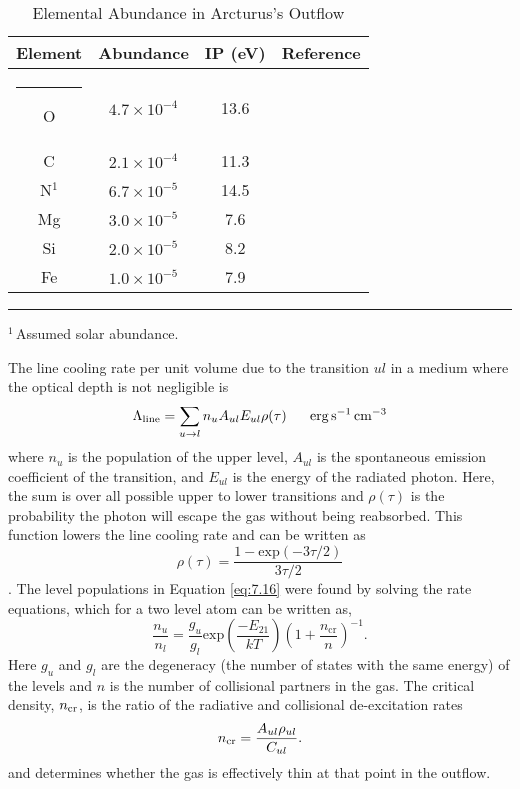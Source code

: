 \begin{table}[!ht]
\begin{center}
\caption[Elemental Abundance in Arcturus's Outflow]{Elemental Abundance in Arcturus's Outflow}
\begin{tabular}{cccc}
\hline
\hline
\rule{0pt}{2.5ex} Element & Abundance & IP (eV) & Reference \\
\hline
\rule{-2.5pt}{2.5ex}	O &  $4.7\times 10^{-4}$ & 13.6 & \cite{ramirez_2011}\\
					C &  $2.1\times 10^{-4}$ & 11.3 & \cite{ramirez_2011}\\
					N$^{1}$ &  $6.7\times 10^{-5}$& 14.5 & \cite{asplund_2009}\\
					Mg & $3.0\times 10^{-5}$ & 7.6 & \cite{ramirez_2011}\\
					Si & $2.0\times 10^{-5}$ & 8.2 & \cite{ramirez_2011}\\
					Fe & $1.0\times 10^{-5}$ & 7.9 & \cite{decin_2003}\\
\hline
\end{tabular}
\label{tab:7.1}
\begin{minipage}{12.5cm}
\rule{-2.5pt}{2.5ex}{\footnotesize $^{1}$\,Assumed solar abundance.}
\end{minipage}
\end{center}
\end{table}

The line cooling rate per unit volume due to the transition $ul$ in a medium where the optical depth is not negligible is 
\begin{equation}
\Lambda _{\rm{line}} =\sum_{u\rightarrow l} n_{u}A_{ul}E_{ul}\rho (\tau) \ \ \ \ \ \rm{erg}\,\rm{s^{-1}\,cm^{-3}}
\end{equation}\label{eq:7.16}
where $n_{u}$ is the population of the upper level, $A_{ul}$ is the spontaneous emission coefficient of the transition, and $E_{ul}$ is the energy of the radiated photon. Here, the sum is over all possible upper to lower transitions and $\rho (\tau)$ is the probability the photon will escape the gas without being reabsorbed. This function lowers the line cooling rate and can be written as 
\begin{equation}
\rho (\tau) = \frac{1-\mathrm{exp}(-3\tau /2)}{3\tau /2}
\end{equation}
\citep{castor_2004}. The level populations in Equation \ref{eq:7.16} were found by solving the rate equations, which for a two level atom can be written as,
\begin{equation}
\frac{n_u}{n_l}=\frac{g_u}{g_l}\mathrm{exp} \left( \frac{-E_{21}}{kT}\right)\left( 1+\frac{n_{\mathrm{cr}}}{n} \right)^{-1}.
\end{equation}
Here $g_{u}$ and $g_{l}$ are the degeneracy (the number of states with the same energy) of the levels and $n$ is the number of collisional partners in the gas. The critical density, $n_{\rm{cr}}$, is the ratio of the radiative and collisional de-excitation rates
\begin{equation}
n_{\rm{cr}}=\frac{A_{ul}\rho _{ul}}{C_{ul}}.
\end{equation}
and determines whether the gas is effectively thin at that point in the outflow.

